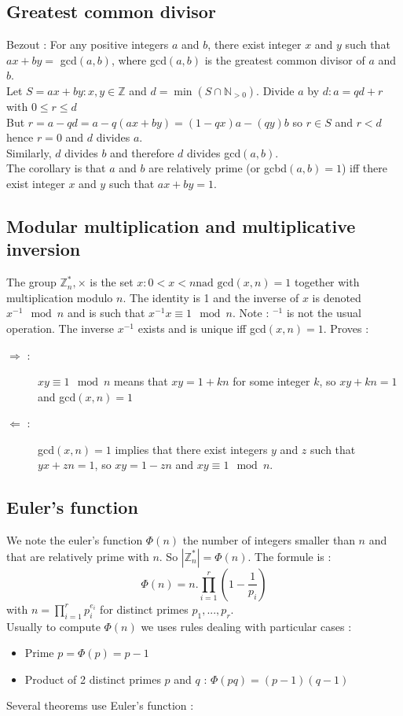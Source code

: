 \documentclass[11pt,a4paper]{report}
\begin{document}
\subsection{Greatest common divisor}
Bezout : For any positive integers $a$ and $b$, there exist integer $x$ and $y$ such that $ax + by =$ gcd$(a,b)$, where gcd$(a,b)$ is the greatest common divisor of $a$ and $b$.\\
Let $S = {ax + by : x,y \in \mathbb{Z}}$ and $d = \min (S \cap \mathbb{N}_{>0})$. Divide $a$ by $d : a = qd + r$ with $0 \leq r \leq d$\\
But $r = a - qd = a -q(ax+by) = (1 - qx)a - (qy)b$ so $r \in S$ and $r < d$ hence $r = 0$ and $d$ divides $a$.\\
Similarly, $d$ divides $b$ and therefore $d$ divides gcd$(a,b)$.\\
The corollary is that $a$ and $b$ are relatively prime (or gcbd$(a,b) = 1$) iff there exist integer $x$ and $y$ such that $ax + by = 1$.

\subsection{Modular multiplication and multiplicative inversion}
The group $\mathbb{Z}_n^*,\times$ is the set ${x : 0 < x <n \text{nad gcd}(x,n) = 1}$ together with multiplication modulo $n$. The identity is 1 and the inverse of $x$ is denoted $x^{-1} \mod n$ and is such that $x^{-1}x \equiv 1 \mod n$. Note : $^{-1}$ is not the usual operation. The inverse $x^{-1}$ exists and is unique iff gcd$(x,n) = 1$. Proves : \\
\begin{description}
\item[$\Rightarrow$ :]$xy \equiv 1 \mod n$ means that $xy = 1 +kn$ for some integer $k$, so $xy + kn = 1$ and gcd$(x,n) = 1$
\item[$\Leftarrow$ :] gcd$(x,n) = 1$ implies that there exist integers $y$ and $z$ such that $yx + zn = 1$, so $xy = 1 - zn$ and $xy \equiv 1 \mod n$. 
\end{description} 

\subsection{Euler's function}
We note the euler's function $\Phi (n)$ the number of integers smaller than $n$ and that are relatively prime with $n$. So $| \mathbb{Z}_n^* | = \Phi(n)$. The formule is :
$$\Phi (n) = n . \prod\limits_{i=1}^r \left( 1 - \frac{1}{p_i} \right)$$
with $n = \prod\limits_{i=1}^r p_i^{e_i}$ for distinct primes $p_1,...,p_r$.\\
Usually to compute $\Phi(n)$ we uses rules dealing with particular cases :
\begin{itemize}
\item Prime $p = \Phi(p) = p-1$
\item Product of 2 distinct primes $p$ and $q$ : $\Phi(pq) = (p-1)(q-1)$
\end{itemize}
Several theorems use Euler's function :\\
\end{document}
